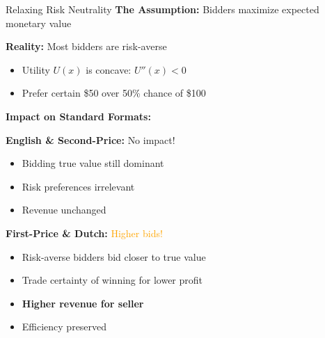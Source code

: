\documentclass[xcolor={x11names}, aspectratio=169 ]{beamer}
\begin{document}
\begin{frame}{Relaxing Risk Neutrality}
\textbf{The Assumption:} Bidders maximize expected monetary value

\textbf{Reality:} Most bidders are risk-averse
\begin{itemize}
  \item Utility $U(x)$ is concave: $U''(x) < 0$
  \item Prefer certain \$50 over 50\% chance of \$100
\end{itemize}

\textbf{Impact on Standard Formats:}

\textbf{English \& Second-Price:} \textcolor{green!70!black}{No impact!}
\begin{itemize}
  \item Bidding true value still dominant
  \item Risk preferences irrelevant
  \item Revenue unchanged
\end{itemize}

\textbf{First-Price \& Dutch:} \textcolor{orange}{Higher bids!}
\begin{itemize}
  \item Risk-averse bidders bid closer to true value
  \item Trade certainty of winning for lower profit
  \item \textbf{Higher revenue for seller}
  \item Efficiency preserved
\end{itemize}
\end{frame}
\end{document}
